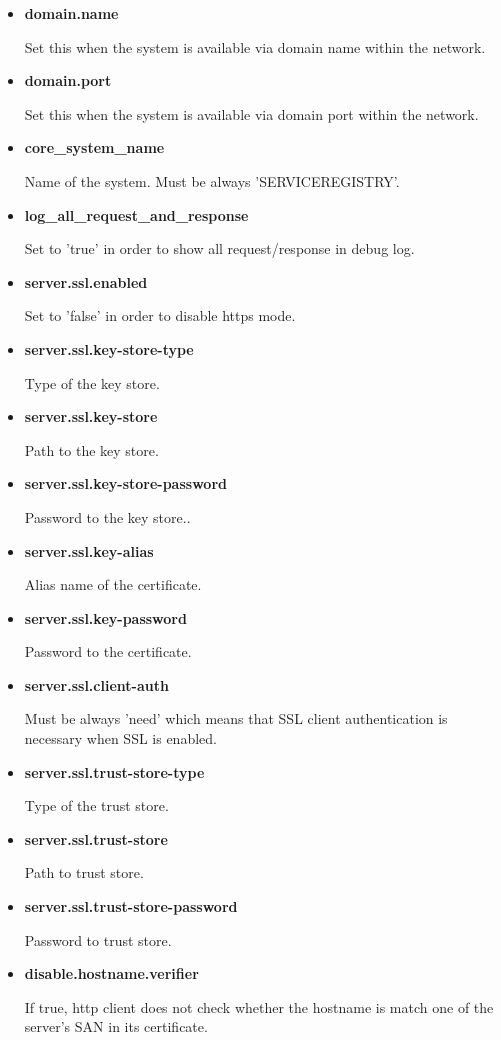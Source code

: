 \documentclass[a4paper]{arrowhead}
\begin{document}
\begin{itemize}
  \item \textbf{domain.name}
  
  Set this when the system is available via domain name within the network.
  
  \item \textbf{domain.port}
  
  Set this when the system is available via domain port within the network.
  
  \item \textbf{core\_system\_name}
  
  Name of the system. Must be always 'SERVICEREGISTRY'.
  
  \item \textbf{log\_all\_request\_and\_response}
  
  Set to 'true' in order to show all request/response in debug log.
  
  \item \textbf{server.ssl.enabled}
  
  Set to 'false' in order to disable https mode.
  
  \item \textbf{server.ssl.key-store-type}
  
  Type of the key store.
  
  \item \textbf{server.ssl.key-store}
  
  Path to the key store.
  
  \item \textbf{server.ssl.key-store-password}
  
  Password to the key store..
  
  \item \textbf{server.ssl.key-alias}
  
  Alias name of the certificate.
  
  \item \textbf{server.ssl.key-password}
  
  Password to the certificate.
  
  \item \textbf{server.ssl.client-auth}
  
  Must be always 'need' which means that SSL client authentication is necessary when SSL is enabled.
  
  \item \textbf{server.ssl.trust-store-type}
  
  Type of the trust store.
  
  \item \textbf{server.ssl.trust-store}
  
  Path to trust store.
  
  \item \textbf{server.ssl.trust-store-password}
  
  Password to trust store.
  
  \item \textbf{disable.hostname.verifier}
  
  If true, http client does not check whether the hostname is match one of the server's SAN in its certificate.
  \end{itemize}
  
\end{document}
